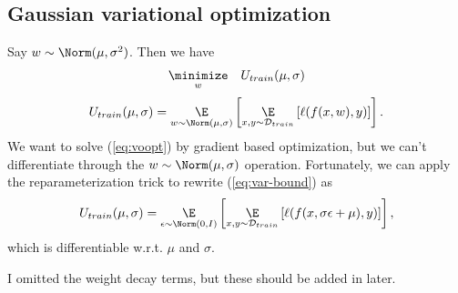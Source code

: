 \documentclass[11pt]{amsart}
\begin{document}
\subsection{Gaussian variational optimization}
Say $w \sim \Norm(\mu, \sigma^2)$.
Then we have 
\begin{align}\label{eq:voopt}
\underset{w}{\minimize} \quad U_{train}(\mu, \sigma)
\end{align}
\begin{align}\label{eq:var-bound}
U_{train}(\mu, \sigma) = \underset{w \sim \Norm(\mu, \sigma)}{\E} \left[ \underset{x, y \sim \mathcal{D}_{train}}{\E} \left[ \ell(f(x, w), y) \right] \right].
\end{align}
We want to solve (\ref{eq:voopt}) by gradient based optimization, but we can't differentiate through the $w \sim \Norm(\mu, \sigma)$ operation. 
Fortunately, we can apply the reparameterization trick to rewrite (\ref{eq:var-bound}) as 
\begin{align}\label{eq:var-bound-reparam}
U_{train}(\mu, \sigma) = \underset{\epsilon \sim \Norm(0, I)}{\E} \left[ \underset{x, y \sim \mathcal{D}_{train}}{\E} \left[ \ell(f(x, \sigma\epsilon+\mu), y) \right] \right],
\end{align}
which is differentiable w.r.t. $\mu$ and $\sigma$.

I omitted the weight decay terms, but these should be added in later.
\end{document}
